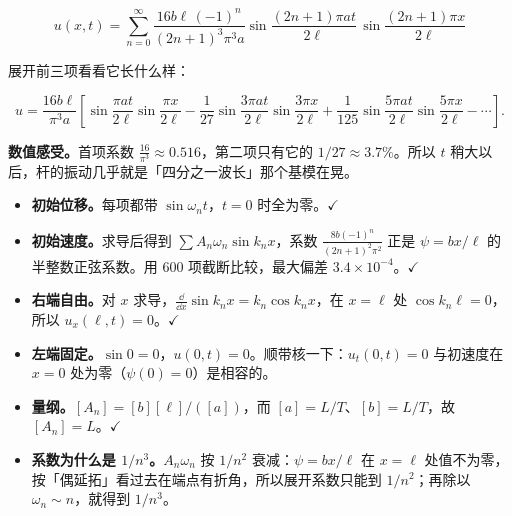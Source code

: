 \documentclass[11pt]{ctexart}
\let\orighdr\hdr
\renewcommand{\hdr}[2]{\par\needspace{7\baselineskip}\orighdr{#1}{#2}}
\begin{document}

\[
\boxed{\;
u(x,t)=\sum_{n=0}^{\infty}\frac{16b\ell\,(-1)^n}{(2n+1)^3\pi^3a}
\sin\frac{(2n+1)\pi at}{2\ell}\,
\sin\frac{(2n+1)\pi x}{2\ell}
\;}
\]

展开前三项看看它长什么样：

\[
u=\frac{16b\ell}{\pi^3a}\left[
\sin\frac{\pi at}{2\ell}\sin\frac{\pi x}{2\ell}
-\frac{1}{27}\sin\frac{3\pi at}{2\ell}\sin\frac{3\pi x}{2\ell}
+\frac{1}{125}\sin\frac{5\pi at}{2\ell}\sin\frac{5\pi x}{2\ell}-\cdots
\right].
\]

\textbf{数值感受。}首项系数 $\frac{16}{\pi^3}\approx0.516$，第二项只有它的 $1/27\approx3.7\%$。所以 $t$ 稍大以后，杆的振动几乎就是「四分之一波长」那个基模在晃。


\begin{itemize}
  \item \textbf{初始位移。}每项都带 $\sin\omega_nt$，$t=0$ 时全为零。$\checkmark$
  \item \textbf{初始速度。}求导后得到 $\sum A_n\omega_n\sin k_nx$，系数 $\frac{8b(-1)^n}{(2n+1)^2\pi^2}$ 正是 $\psi=bx/\ell$ 的半整数正弦系数。用 600 项截断比较，最大偏差 $3.4\times10^{-4}$。$\checkmark$
  \item \textbf{右端自由。}对 $x$ 求导，$\frac{\dd}{\dd x}\sin k_nx=k_n\cos k_nx$，在 $x=\ell$ 处 $\cos k_n\ell=0$，所以 $u_x(\ell,t)=0$。$\checkmark$
  \item \textbf{左端固定。}$\sin0=0$，$u(0,t)=0$。顺带核一下：$u_t(0,t)=0$ 与初速度在 $x=0$ 处为零（$\psi(0)=0$）是相容的。
  \item \textbf{量纲。}$[A_n]=[b][\ell]/([a])$，而 $[a]=L/T$、$[b]=L/T$，故 $[A_n]=L$。$\checkmark$
  \item \textbf{系数为什么是 $1/n^3$。}$A_n\omega_n$ 按 $1/n^2$ 衰减：$\psi=bx/\ell$ 在 $x=\ell$ 处值不为零，按「偶延拓」看过去在端点有折角，所以展开系数只能到 $1/n^2$；再除以 $\omega_n\sim n$，就得到 $1/n^3$。
\end{itemize}

\label{sec:q3}


\end{document}
